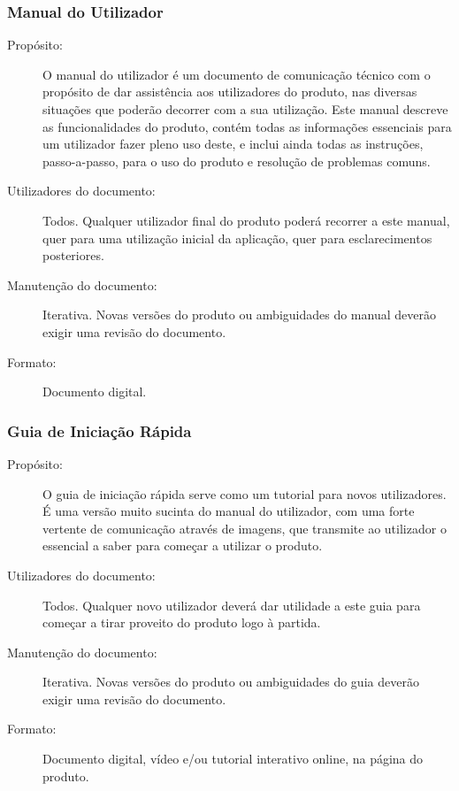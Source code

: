 \documentclass[12pt,a4paper]{article}
\begin{document}
    \subsubsection{Manual do Utilizador}
      \begin{description}
        \item[Propósito:]O manual do utilizador é um documento de comunicação técnico com o propósito de dar assistência aos utilizadores do produto, nas diversas situações que poderão decorrer com a sua utilização. Este manual descreve as funcionalidades do produto, contém todas as informações essenciais para um utilizador fazer pleno uso deste, e inclui ainda todas as instruções, passo-a-passo, para o uso do produto e resolução de problemas comuns.
        \item[Utilizadores do documento:]Todos. Qualquer utilizador final do produto poderá recorrer a este manual, quer para uma utilização inicial da aplicação, quer para esclarecimentos posteriores.

        \item[Manutenção do documento:]Iterativa. Novas versões do produto ou ambiguidades do manual deverão exigir uma revisão do documento.

        \item[Formato:]Documento digital.
      \end{description}

    \subsubsection{Guia de Iniciação Rápida}
      \begin{description}
        \item[Propósito:]O guia de iniciação rápida serve como um tutorial para novos utilizadores. É uma versão muito sucinta do manual do utilizador, com uma forte vertente de comunicação através de imagens, que transmite ao utilizador o essencial a saber para começar a utilizar o produto.

        \item[Utilizadores do documento:]Todos. Qualquer novo utilizador deverá dar utilidade a este guia para começar a tirar proveito do produto logo à partida.

        \item[Manutenção do documento:]Iterativa. Novas versões do produto ou ambiguidades do guia deverão exigir uma revisão do documento.
        \item[Formato:]Documento digital, vídeo e/ou tutorial interativo online, na página do produto.
      \end{description}
\end{document}
